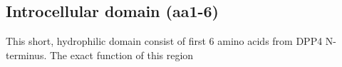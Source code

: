 \subsection{Introcellular domain (aa1-6)}

This short, hydrophilic domain consist of first 6 amino acids from DPP4 N-terminus. The exact function of this region 